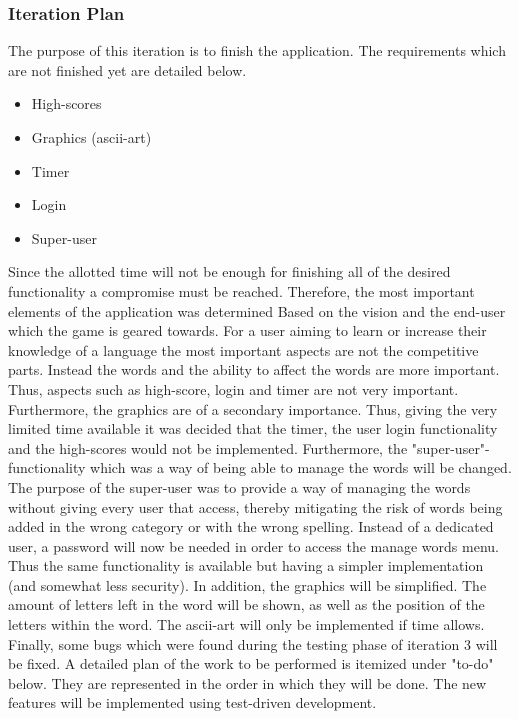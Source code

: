 \documentclass[12pt, letterpaper]{article}
\begin{document}
\subsubsection{Iteration Plan}
The purpose of this iteration is to finish the application. The requirements which are not finished yet are detailed below.
\begin{itemize}
	\item High-scores
	\item Graphics (ascii-art)
	\item Timer
	\item Login
	\item Super-user
\end{itemize}
Since the allotted time will not be enough for finishing all of the desired functionality a compromise must be reached. Therefore, the most important elements of the application was determined Based on the vision and the end-user which the game is geared towards. For a user aiming to learn or increase their knowledge of a language the most important aspects are not the competitive parts. Instead the words and the ability to affect the words are more important. Thus, aspects such as high-score, login and timer are not very important. Furthermore, the graphics are of a secondary importance. Thus, giving the very limited time available it was decided that the timer, the user login functionality and the high-scores would not be implemented.
\newline
\newline
 Furthermore, the "super-user"-functionality which was a way of being able to manage the words will be changed. The purpose of the super-user was to provide a way of managing the words without giving every user that access, thereby mitigating the risk of words being added in the wrong category or with the wrong spelling. Instead of a dedicated user, a password will now be needed in order to access the manage words menu. Thus the same functionality is available but having a simpler implementation (and somewhat less security).
 \newline
 \newline
 In addition, the graphics will be simplified. The amount of letters left in the word will be shown, as well as the position of the letters within the word. The ascii-art will only be implemented if time allows.
 \newline
 \newline
 Finally, some bugs which were found during the testing phase of iteration 3 will be fixed. A detailed plan of the work to be performed is itemized under "to-do" below. They are represented in the order in which they will be done. The new features will be implemented using test-driven development.
\end{document}
